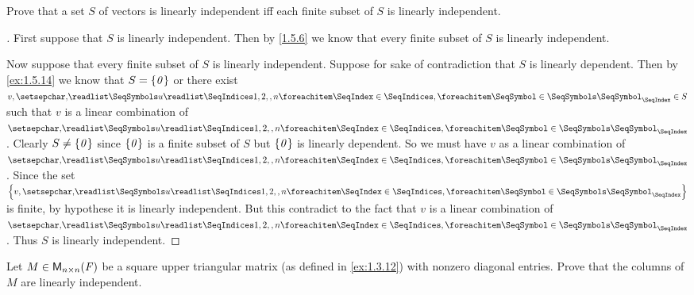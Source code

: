 \begin{ex}\label{ex:1.5.16}
  Prove that a set \(S\) of vectors is linearly independent iff each finite subset of \(S\) is linearly independent.
\end{ex}

\begin{proof}[]
  First suppose that \(S\) is linearly independent.
  Then by \cref{1.5.6} we know that every finite subset of \(S\) is linearly independent.

  Now suppose that every finite subset of \(S\) is linearly independent.
  Suppose for sake of contradiction that \(S\) is linearly dependent.
  Then by \cref{ex:1.5.14} we know that \(S = \left\lbrace\mathit{0}\right\rbrace\) or there exist \(v, \seq{u}{1,2,,n} \in S\) such that \(v\) is a linear combination of \(\seq{u}{1,2,,n}\).
  Clearly \(S \neq \left\lbrace\mathit{0}\right\rbrace\) since \(\left\lbrace\mathit{0}\right\rbrace\) is a finite subset of \(S\) but \(\left\lbrace\mathit{0}\right\rbrace\) is linearly dependent.
  So we must have \(v\) as a linear combination of \(\seq{u}{1,2,,n}\).
  Since the set \(\set{v,\seq{u}{1,2,,n}}\) is finite, by hypothese it is linearly independent.
  But this contradict to the fact that \(v\) is a linear combination of \(\seq{u}{1,2,,n}\).
  Thus \(S\) is linearly independent.
\end{proof}

\begin{ex}\label{ex:1.5.17}
  Let \(M \in \mathsf{M}_{{n} \times n}({\mathit{F}})\) be a square upper triangular matrix (as defined in \cref{ex:1.3.12}) with nonzero diagonal entries.
  Prove that the columns of \(M\) are linearly independent.
\end{ex}

